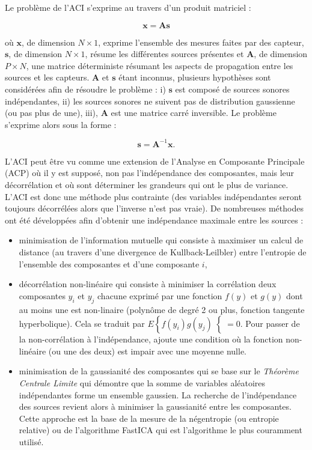 Le problème de l'ACI s'exprime au travers d'un produit matriciel : 

\begin{equation}\label{eq:ACI2}
\mathbf{x} = \mathbf{As}
\end{equation}

où $\mathbf{x}$, de dimension $N \times 1$, exprime l'ensemble des mesures faites par des capteur, $\mathbf{s}$, de dimension $N \times 1$, résume les différentes sources présentes et $\mathbf{A}$, de dimension $P \times N$, une matrice déterministe résumant les aspects de propagation entre les sources et les capteurs. 
$\mathbf{A}$ et $\mathbf{s}$ étant inconnus, plusieurs hypothèses sont considérées afin de résoudre le problème : i) $\mathbf{s}$ est composé de sources sonores indépendantes, ii) les sources sonores ne suivent pas de distribution gaussienne (ou pas plus de une), iii), $\mathbf{A}$ est une matrice carré inversible. Le problème s'exprime alors sous la forme : 

\begin{equation}
\mathbf{s} = \mathbf{A}^{-1}\mathbf{x}.
\end{equation}

L'ACI peut être vu comme une extension de l'Analyse en Composante Principale (ACP) où il y est supposé, non pas l'indépendance des composantes, mais leur décorrélation et où sont déterminer les grandeurs qui ont le plus de variance. L'ACI est donc une méthode plus contrainte (des variables indépendantes seront toujours décorrélées alors que l'inverse n'est pas vraie).
De nombreuses méthodes ont été développées afin d'obtenir une indépendance maximale entre les sources : 

\begin{itemize}
\item minimisation de l'information mutuelle \cite{hyvarinen97independentcomponent} qui consiste à maximiser un calcul de distance (au travers d'une divergence de Kullback-Leilbler) entre l'entropie de l'ensemble des composantes et d'une composante $i$, 
\item décorrélation non-linéaire qui consiste à minimiser la corrélation deux composantes $y_i$ et $y_j$ chacune exprimé par une fonction $f(y)$ et $g(y)$ dont au moins une est non-linaire (polynôme de degré 2 ou plus, fonction tangente hyperbolique). Cela se traduit par $E\left\lbrace f(y_i)g(y_j) \right\lbrace = 0$. Pour passer de la non-corrélation à l'indépendance, \cite{} ajoute une condition où la fonction non-linéaire (ou une des deux)  est impair avec une moyenne nulle.
\item minimisation de la \og gaussianité \fg{} des composantes qui se base sur le \textit{Théorème Centrale Limite} qui démontre que la somme de variables aléatoires indépendantes forme un ensemble gaussien. La recherche de l'indépendance des sources revient alors à minimiser la \og gaussianité \fg{} entre les composantes. Cette approche est la base de la mesure de la négentropie (ou entropie relative) \cite{lee2000unifying} ou de l'algorithme FastICA \cite{hyvarinen1999fast} qui est l'algorithme le plus couramment utilisé.
\end{itemize}


